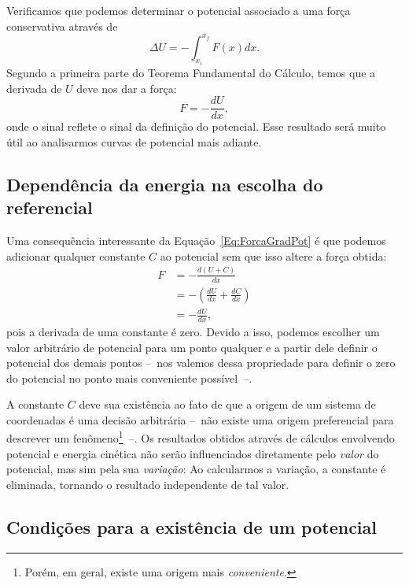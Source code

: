 Verificamos que podemos determinar o potencial associado a uma força conservativa através de
\begin{equation}
  \Delta U = - \int_{x_i}^{x_f} F(x) dx.
\end{equation}
%
Segundo a primeira parte do Teorema Fundamental do Cálculo, temos que a derivada de $U$ deve nos dar a força:
\begin{equation}\label{Eq:ForcaGradPot}
  F =  -\frac{dU}{dx},
\end{equation}
%
onde o sinal reflete o sinal da definição do potencial. Esse resultado será muito útil ao analisarmos curvas de potencial mais adiante.

\subsection{Dependência da energia na escolha do referencial}

Uma consequência interessante da Equação~\eqref{Eq:ForcaGradPot} é que podemos adicionar qualquer constante $C$ ao potencial sem que isso altere a força obtida:
\begin{align}
  F &= - \frac{d(U+C)}{dx} \\
  &= -\left(\frac{dU}{dx} + \frac{dC}{dx}\right) \\
  &= -\frac{dU}{dx},
\end{align}
%
pois a derivada de uma constante é zero. Devido a isso, podemos escolher um valor arbitrário de potencial para um ponto qualquer e a partir dele definir o potencial dos demais pontos --~nos valemos dessa propriedade para definir o zero do potencial no ponto mais conveniente possível~--.

A constante $C$ deve sua existência ao fato de que a origem de um sistema de coordenadas é uma decisão arbitrária --~não existe uma origem preferencial para descrever um fenômeno\footnote{Porém, em geral, existe uma origem mais \emph{conveniente}.}~--. Os resultados obtidos através de cálculos envolvendo potencial e energia cinética não serão influenciados diretamente pelo \emph{valor} do potencial, mas sim pela sua \emph{variação}: Ao calcularmos a variação, a constante é eliminada, tornando o resultado independente de tal valor.

\subsection{Condições para a existência de um potencial}

